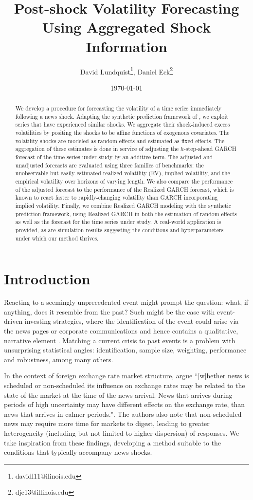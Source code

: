 \documentclass[11pt]{article}
\title{Post-shock Volatility Forecasting Using Aggregated Shock Information}
\author{David Lundquist\thanks{davidl11@ilinois.edu}, Daniel Eck\thanks{dje13@illinois.edu} }
\affil{Department of Statistics, University of Illinois at Urbana-Champaign}
\date{\today}
\theoremstyle{definition}
\begin{document}
\maketitle

\begin{abstract} 
We develop a procedure for forecasting the volatility of a time series immediately following a news shock.  Adapting the synthetic prediction framework of \citet{lin2021minimizing}, we exploit series that have experienced similar shocks.  We aggregate their shock-induced excess volatilities by positing the shocks to be affine functions of exogenous covariates.  The volatility shocks are modeled as random effects and estimated as fixed effects.  The aggregation of these estimates is done in service of adjusting the $h$-step-ahead GARCH forecast of the time series under study by an additive term.  The adjusted and unadjusted forecasts are evaluated using three families of benchmarks: the unobservable but easily-estimated realized volatility (RV), implied volatility, and the empirical volatility over horizons of varying length.  We also compare the performance of the adjusted forecast to the performance of the Realized GARCH forecast, which is known to react faster to rapidly-changing volatility than GARCH incorporating implied volatility.  Finally, we combine Realized GARCH modeling with the synthetic prediction framework, using Realized GARCH in both the estimation of random effects as well as the forecast for the time series under study.  A real-world application is provided, as are simulation results suggesting the conditions and hyperparameters under which our method thrives.
\end{abstract}

\section{Introduction}

Reacting to a seemingly unprecedented event might prompt the question: what, if anything, does it resemble from the past?  Such might be the case with event-driven investing strategies, where the identification of the event could arise via the news pages or corporate communications and hence contains a qualitative, narrative element \citep{Kenton}.  Matching a current crisis to past events is a problem with unsurprising statistical angles: identification, sample size, weighting, performance and robustness, among many others.  

In the context of foreign exchange rate market structure, \citet{dominguez2006defines} argue ``[w]hether news is scheduled or non-scheduled its influence on exchange rates may be related
to the state of the market at the time of the news arrival.  News that arrives during periods of
high uncertainty may have different effects on the exchange rate, than news that arrives in
calmer periods.". The authors also note that non-scheduled news may require more time for markets to digest, leading to greater heterogeneity (including but not limited to higher dispersion) of responses.  We take inspiration from these findings, developing a method suitable to the conditions that typically accompany news shocks. 
\end{document}
